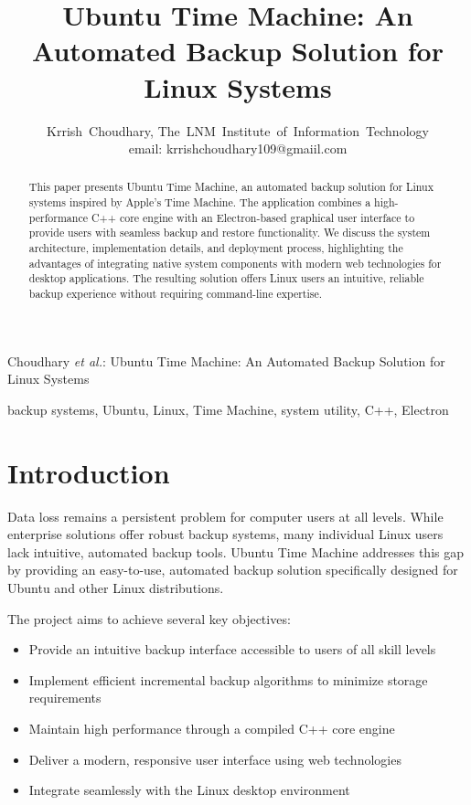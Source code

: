 \documentclass[journal,twoside,10pt]{IEEEtran}
\begin{document}
\title{Ubuntu Time Machine: An Automated Backup Solution for Linux Systems}

\author{Krrish~Choudhary,
        The~LNM~Institute~of~Information~Technology\\
        email: krrishchoudhary109@gmaiil.com}

%
{Choudhary \MakeLowercase{\textit{et al.}}: Ubuntu Time Machine: An Automated Backup Solution for Linux Systems}

\maketitle

\begin{abstract}
This paper presents Ubuntu Time Machine, an automated backup solution for Linux systems inspired by Apple's Time Machine. The application combines a high-performance C++ core engine with an Electron-based graphical user interface to provide users with seamless backup and restore functionality. We discuss the system architecture, implementation details, and deployment process, highlighting the advantages of integrating native system components with modern web technologies for desktop applications. The resulting solution offers Linux users an intuitive, reliable backup experience without requiring command-line expertise.
\end{abstract}

\begin{IEEEkeywords}
backup systems, Ubuntu, Linux, Time Machine, system utility, C++, Electron
\end{IEEEkeywords}

\section{Introduction}
Data loss remains a persistent problem for computer users at all levels. While enterprise solutions offer robust backup systems, many individual Linux users lack intuitive, automated backup tools. Ubuntu Time Machine addresses this gap by providing an easy-to-use, automated backup solution specifically designed for Ubuntu and other Linux distributions.

The project aims to achieve several key objectives:
\begin{itemize}
    \item Provide an intuitive backup interface accessible to users of all skill levels
    \item Implement efficient incremental backup algorithms to minimize storage requirements
    \item Maintain high performance through a compiled C++ core engine
    \item Deliver a modern, responsive user interface using web technologies
    \item Integrate seamlessly with the Linux desktop environment
\end{itemize}
\end{document}
